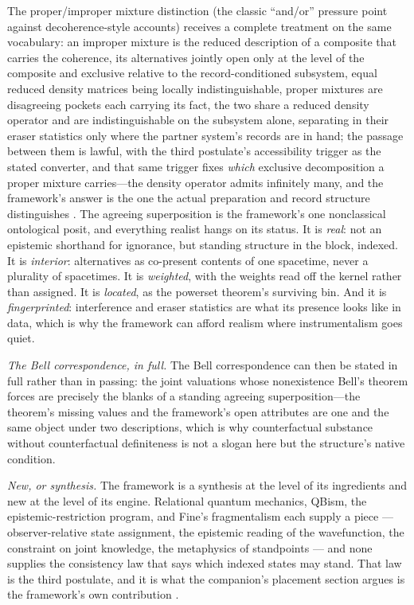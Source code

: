 \documentclass[11pt]{article}
\theoremstyle{definition}
\begin{document}
The proper/improper mixture distinction (the classic ``and/or'' pressure point against decoherence-style accounts) receives a complete treatment on the same vocabulary: an improper mixture is the reduced description of a composite that carries the coherence, its alternatives jointly open only at the level of the composite and exclusive relative to the record-conditioned subsystem, equal reduced density matrices being locally indistinguishable, proper mixtures are disagreeing pockets each carrying its fact, the two share a reduced density operator and are indistinguishable on the subsystem alone, separating in their eraser statistics only where the partner system's records are in hand; the passage between them is lawful, with the third postulate's accessibility trigger as the stated converter, and that same trigger fixes \emph{which} exclusive decomposition a proper mixture carries---the density operator admits infinitely many, and the framework's answer is the one the actual preparation and record structure distinguishes \cite{Aethus}. The agreeing superposition is the framework's one nonclassical ontological posit, and everything realist hangs on its status. It is \emph{real}: not an epistemic shorthand for ignorance, but standing structure in the block, indexed. It is \emph{interior}: alternatives as co-present contents of one spacetime, never a plurality of spacetimes. It is \emph{weighted}, with the weights read off the kernel rather than assigned. It is \emph{located}, as the powerset theorem's surviving bin. And it is \emph{fingerprinted}: interference and eraser statistics are what its presence looks like in data, which is why the framework can afford realism where instrumentalism goes quiet.

\textit{The Bell correspondence, in full.} The Bell correspondence can then be stated in full rather than in passing: the joint valuations whose nonexistence Bell's theorem forces are precisely the blanks of a standing agreeing superposition---the theorem's missing values and the framework's open attributes are one and the same object under two descriptions, which is why counterfactual substance without counterfactual definiteness is not a slogan here but the structure's native condition.

\textit{New, or synthesis.} The framework is a synthesis at the level of its ingredients and new at the level of its engine. Relational quantum mechanics, QBism, the epistemic-restriction program, and Fine's fragmentalism each supply a piece --- observer-relative state assignment, the epistemic reading of the wavefunction, the constraint on joint knowledge, the metaphysics of standpoints --- and none supplies the consistency law that says which indexed states may stand. That law is the third postulate, and it is what the companion's placement section argues is the framework's own contribution \cite{AethusRealist}.
\end{document}

